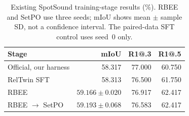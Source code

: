 \begin{table}[t]
\centering
\caption{Existing SpotSound training-stage results (\%). RBEE and SetPO use three seeds; mIoU shows mean $\pm$ sample SD, not a confidence interval. The paired-data SFT control uses seed~0 only.}
\label{tab:stages}
\small
\setlength{\tabcolsep}{3pt}
\begin{tabular}{@{}lrrr@{}}
\toprule
Stage & mIoU & R1@.3 & R1@.5\\
\midrule
Official, our harness & 58.317 & 77.000 & 60.750\\
RelTwin SFT & 58.313 & 76.500 & 61.750\\
RBEE & $59.166\pm0.020$ & 76.917 & 62.417\\
RBEE $\to$ SetPO & $59.193\pm0.068$ & 76.583 & 62.417\\
\bottomrule
\end{tabular}
\end{table}
